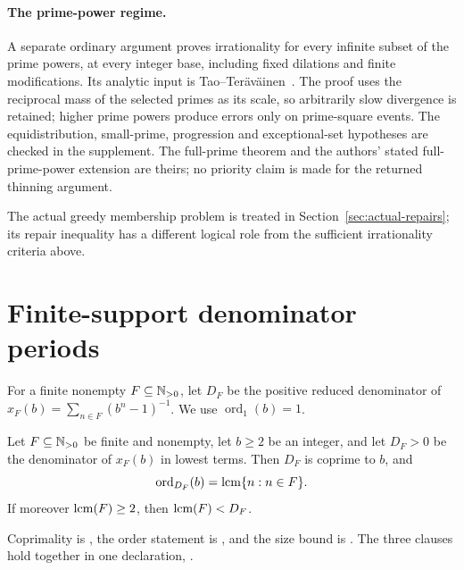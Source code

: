 \documentclass[11pt]{article}
\begin{document}
\paragraph{The prime-power regime.}
A separate ordinary argument proves irrationality for every infinite
subset of the prime powers, at every integer base, including fixed
dilations and finite modifications.  Its analytic input is
Tao--Ter\"av\"ainen~\cite[Theorem~3.1]{taoteravainen2025}.
The proof uses the reciprocal mass of the selected primes as its scale,
so arbitrarily slow divergence is retained; higher prime powers produce
errors only on prime-square events.  The equidistribution, small-prime,
progression and exceptional-set hypotheses are checked in the supplement.
The full-prime theorem and the authors' stated full-prime-power extension
are theirs; no priority claim is made for the returned thinning argument.

The actual greedy membership problem is treated in
Section~\ref{sec:actual-repairs}; its repair inequality has a different
logical role from the sufficient irrationality criteria above.

\section{Finite-support denominator periods}\label{sec:period}

For a finite nonempty $F\subseteq\mathbb{N}_{>0}$, let $D_F$ be the positive reduced
denominator of $x_F(b)=\sum_{n\in F}(b^n-1)^{-1}$.
We use $\operatorname{ord}_1(b)=1$.

\begin{theorem}\label{res:period}
Let $F\subseteq\mathbb{N}_{>0}$ be finite and nonempty, let $b\ge2$ be an integer, and
let $D_F>0$ be the denominator of $x_F(b)$ in lowest terms.  Then $D_F$ is
coprime to $b$, and
\[
  \operatorname{ord}_{D_F}(b)=\operatorname{lcm}\{n:n\in F\}.
\]
If moreover $\operatorname{lcm}(F)\ge2$, then $\operatorname{lcm}(F)<D_F$.
\end{theorem}

Coprimality is
, the order statement is
, and the size bound is
.
The three clauses hold together in one declaration,
\href{https://github.com/wcook04/plectis-erdos/blob/f36a98bf3d3e6f65f1074e3b800e3293d5b8a51a/ErdosProblems/Erdos257/PaperCompleteR7/Assemblies.lean#L29}{}.
\end{document}
